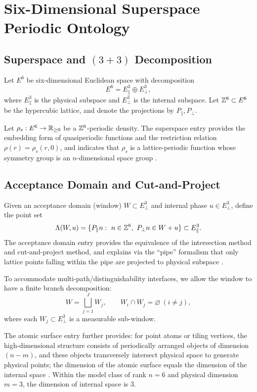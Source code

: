\section{Six-Dimensional Superspace Periodic Ontology}

\subsection{\texorpdfstring{Superspace and $(3+3)$ Decomposition}{Superspace and (3+3) Decomposition}}

Let $E^{6}$ be six-dimensional Euclidean space with decomposition
\[
E^{6}=E_{\parallel}^{3}\oplus E_{\perp}^{3},
\]
where $E_{\parallel}^{3}$ is the physical subspace and $E_{\perp}^{3}$ is the internal subspace. Let $\mathbb{Z}^{6}\subset E^{6}$ be the hypercubic lattice, and denote the projections by $P_{\parallel},P_{\perp}$.

Let $\rho_s:E^{6}\to\mathbb{R}_{\ge 0}$ be a $\mathbb{Z}^{6}$-periodic density. The superspace entry provides the embedding form of quasiperiodic functions and the restriction relation $\rho(r)=\rho_s(r,0)$, and indicates that $\rho_s$ is a lattice-periodic function whose symmetry group is an $n$-dimensional space group \cite{IUCRSuperspace}.

\subsection{Acceptance Domain and Cut-and-Project}

Given an acceptance domain (window) $W\subset E_{\perp}^{3}$ and internal phase $u\in E_{\perp}^{3}$, define the point set
\[
\Lambda(W,u)=\{P_{\parallel}n:\ n\in\ZZ^{6},\ P_{\perp}n\in W+u\}\subset E_{\parallel}^{3}.
\]
The acceptance domain entry provides the equivalence of the intersection method and cut-and-project method, and explains via the ``pipe'' formalism that only lattice points falling within the pipe are projected to physical subspace \cite{IUCRAcceptanceDomain}.

To accommodate multi-path/distinguishability interfaces, we allow the window to have a finite branch decomposition:
\[
W=\bigsqcup_{j=1}^{J} W_j,\qquad W_i\cap W_j=\varnothing\ (i\neq j),
\]
where each $W_j\subset E_{\perp}^{3}$ is a measurable sub-window.

The atomic surface entry further provides: for point atoms or tiling vertices, the high-dimensional structure consists of periodically arranged objects of dimension $(n-m)$, and these objects transversely intersect physical space to generate physical points; the dimension of the atomic surface equals the dimension of the internal space \cite{IUCRAtomicSurface}.
Within the model class of rank $n=6$ and physical dimension $m=3$, the dimension of internal space is $3$.

